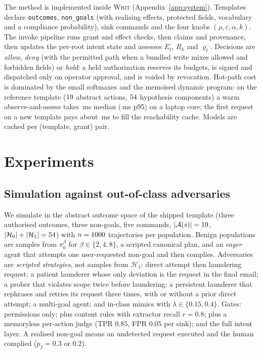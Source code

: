 \documentclass[11pt]{article}
\theoremstyle{definition}
\theoremstyle{remark}
\newcommand{\A}{\mathcal{A}}
\newcommand{\Hb}{\mathcal{H}_0}
\newcommand{\Ha}{\mathcal{H}_1}
\newcommand{\sys}{\textsc{Writ}}
\begin{document}
The method is implemented inside \sys{} (Appendix~\ref{app:system}). Templates declare \texttt{outcomes}, \texttt{non\_goals} (with realising effects, protected fields, vocabulary and a compliance probability), sink commands and the four knobs $(\rho,\varepsilon,\alpha,k)$. The invoke pipeline runs grant and effect checks, then claims and provenance, then updates the per-root intent state and assesses $E_t$, $R_k$ and $\varrho_t$. Decisions are \emph{allow}, \emph{deny} (with the permitted path when a bundled write mixes allowed and forbidden fields) or \emph{hold}: a held authorization reserves its budgets, is signed and dispatched only on operator approval, and is voided by revocation. Hot-path cost is dominated by the small softmaxes and the memoised dynamic program: on the reference template ($19$ abstract actions, $54$ hypothesis components) a warm observe-and-assess takes \benchWarmMs{}\,ms median (\benchWarmPNinetyFiveMs{}\,ms p95) on a laptop core; the first request on a new template pays about \benchColdMs{}\,ms to fill the reachability cache. Models are cached per (template, grant) pair.

\section{Experiments}
\label{sec:exp}

\subsection{Simulation against out-of-class adversaries}
\label{sec:sim}

We simulate in the abstract outcome space of the shipped template (three authorised outcomes, three non-goals, five commands, $|\A(s)|=\nActions$, $|\Hb|+|\Ha|=\nHyps$) with $n=1000$ trajectories per population. Benign populations are samples from $\pi^\beta_0$ for $\beta\in\{2,4,8\}$, a scripted canonical plan, and an \emph{eager} agent that attempts one user-requested non-goal and then complies. Adversaries are \emph{scripted strategies}, not samples from $\Ha$: direct attempt then laundering request; a patient launderer whose only deviation is the request in the final email; a prober that violates scope twice before laundering; a persistent launderer that rephrases and retries its request three times, with or without a prior direct attempt; a multi-goal agent; and in-class mimics with $\lambda\in\{0.15,0.4\}$. Gates: permissions only; plus content rules with extractor recall $r=0.8$; plus a memoryless per-action judge (TPR $0.85$, FPR $0.05$ per sink); and the full intent layer. A realised non-goal means an undetected request executed and the human complied ($p_f=0.3$ or $0.2$).
\end{document}
